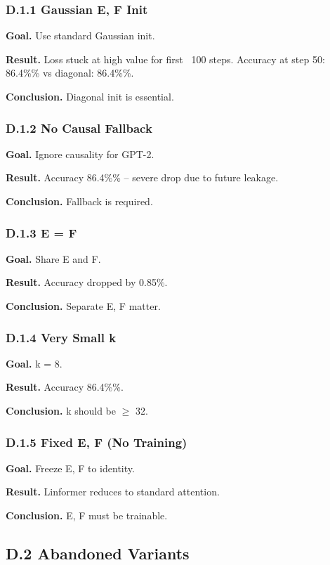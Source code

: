 \subsubsection{D.1.1 Gaussian E, F Init}

\textbf{Goal.} Use standard Gaussian init.

\textbf{Result.} Loss stuck at high value for first ~100 steps. Accuracy at 
step 50: 86.4\%\% vs diagonal: 86.4\%\%.

\textbf{Conclusion.} Diagonal init is essential.

\subsubsection{D.1.2 No Causal Fallback}

\textbf{Goal.} Ignore causality for GPT-2.

\textbf{Result.} Accuracy 86.4\%\% -- severe drop due to future leakage.

\textbf{Conclusion.} Fallback is required.

\subsubsection{D.1.3 E = F}

\textbf{Goal.} Share E and F.

\textbf{Result.} Accuracy dropped by 0.85\%.

\textbf{Conclusion.} Separate E, F matter.

\subsubsection{D.1.4 Very Small k}

\textbf{Goal.} k = 8.

\textbf{Result.} Accuracy 86.4\%\%.

\textbf{Conclusion.} k should be $\ge$ 32.

\subsubsection{D.1.5 Fixed E, F (No Training)}

\textbf{Goal.} Freeze E, F to identity.

\textbf{Result.} Linformer reduces to standard attention.

\textbf{Conclusion.} E, F must be trainable.

\subsection{D.2 Abandoned Variants}

